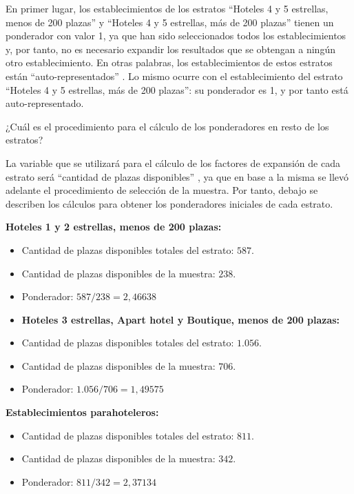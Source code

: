 \documentclass[
]{book}
\begin{document}
En primer lugar, los establecimientos de los estratos ``Hoteles 4 y 5 estrellas, menos de 200 plazas'' y ``Hoteles 4 y 5 estrellas, más de 200 plazas'' tienen un ponderador con valor 1, ya que han sido seleccionados todos los establecimientos y, por tanto, no es necesario expandir los resultados que se obtengan a ningún otro establecimiento. En otras palabras, los establecimientos de estos estratos están ``auto-representados'' . Lo mismo ocurre con el establecimiento del estrato ``Hoteles 4 y 5 estrellas, más de 200 plazas'': su ponderador es 1, y por tanto está auto-representado.

¿Cuál es el procedimiento para el cálculo de los ponderadores en resto de los estratos?

La variable que se utilizará para el cálculo de los factores de expansión de cada estrato será ``cantidad de plazas disponibles'' , ya que en base a la misma se llevó adelante el procedimiento de selección de la muestra. Por tanto, debajo se describen los cálculos para obtener los ponderadores iniciales de cada estrato.

\textbf{Hoteles 1 y 2 estrellas, menos de 200 plazas:}

\begin{itemize}
\item
  Cantidad de plazas disponibles totales del estrato: \(587\).
\item
  Cantidad de plazas disponibles de la muestra: \(238\).
\item
  Ponderador: \(587/238=2,46638\)
\item
  \textbf{Hoteles 3 estrellas, Apart hotel y Boutique, menos de 200 plazas:}
\item
  Cantidad de plazas disponibles totales del estrato: \(1.056\).
\item
  Cantidad de plazas disponibles de la muestra: \(706\).
\item
  Ponderador: \(1.056/706=1,49575\)
\end{itemize}

\textbf{Establecimientos parahoteleros:}

\begin{itemize}
\item
  Cantidad de plazas disponibles totales del estrato: \(811\).
\item
  Cantidad de plazas disponibles de la muestra: \(342\).
\item
  Ponderador: \(811/342=2,37134\)
\end{itemize}
\end{document}

